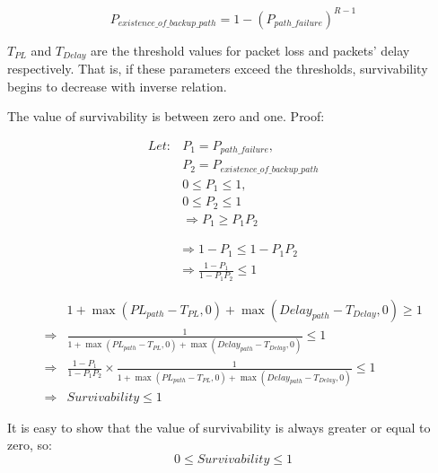 \documentclass[onecolumn,conference]{IEEEtran}
\begin{document}
    \begin{equation}
        P_{existence\_of\_backup\_path} = 1-\left( P_{path\_failure} \right)^{R-1}
    \end{equation}

    $T_{PL}$ and $T_{Delay}$ are the threshold values for packet loss and packets' delay respectively. That is, if these parameters exceed the thresholds, survivability begins to decrease with inverse relation.

    The value of survivability is between zero and one. Proof:

    \begin{equation}
        \begin{split}
            Let:&P_1=P_{path\_failure},\\
            &P_2=P_{existence\_of\_backup\_path} \\
            &0 \leq P_1 \leq 1, \\
            &0 \leq P_2 \leq 1 \\
            &\Rightarrow P_1 \geq P_1P_2
        \end{split}
    \end{equation}

    \begin{equation}
        \begin{split}
            &\Rightarrow 1-P_1\leq 1-P_1P_2 \\
            &\Rightarrow \frac{1-P_1}{1-P_1P_2}\leq1
        \end{split}
    \end{equation}

    \begin{equation}
        \begin{split}
            & 1+\max\left( PL_{path} -T_{PL},0 \right)+\max\left( Delay_{path}-T_{Delay},0 \right) \geq 1 \\
            \Rightarrow & \frac{1}{1+\max\left( PL_{path} -T_{PL},0 \right)+\max\left( Delay_{path}-T_{Delay},0 \right)} \leq 1 \\
            \Rightarrow & \frac{1-P_1}{1-P_1P_2}\times\frac{1}{1+\max\left( PL_{path} -T_{PL},0 \right)+\max\left( Delay_{path}-T_{Delay},0 \right)}\leq 1 \\
            \Rightarrow & Survivability \leq 1
        \end{split}
    \end{equation}

    It is easy to show that the value of survivability is always greater or equal to zero, so:
    \begin{equation}
        0 \leq Survivability \leq 1
    \end{equation}
    
\end{document}
